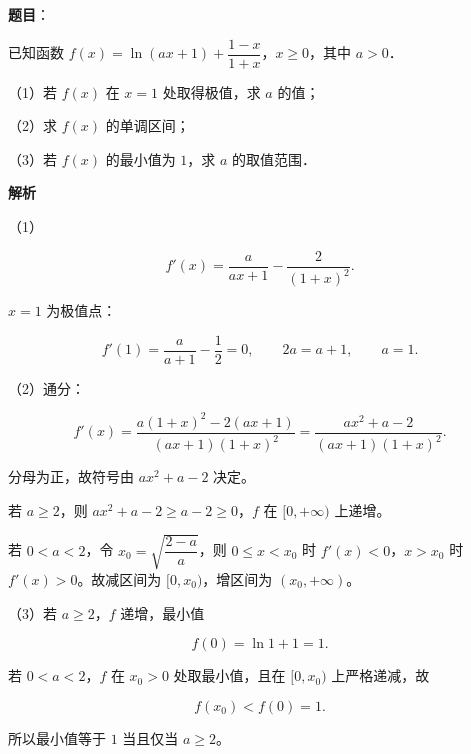 \begin{answer}

\textbf{题目}：

已知函数 $f(x)=\ln(ax+1)+\dfrac{1-x}{1+x}$，$x\geqslant0$，其中 $a>0$．

（1）若 $f(x)$ 在 $x=1$ 处取得极值，求 $a$ 的值；

（2）求 $f(x)$ 的单调区间；

（3）若 $f(x)$ 的最小值为 $1$，求 $a$ 的取值范围．

\textbf{解析}

（1）

\nopagebreak[4]
\[f'(x)=\frac a{ax+1}-\frac2{(1+x)^2}.\]

$x=1$ 为极值点：

\nopagebreak[4]
\[f'(1)=\frac a{a+1}-\frac12=0,\qquad 2a=a+1,\qquad a=1.\]

（2）通分：

\nopagebreak[4]
\[f'(x)=\frac{a(1+x)^2-2(ax+1)}{(ax+1)(1+x)^2}
=\frac{ax^2+a-2}{(ax+1)(1+x)^2}.\]

分母为正，故符号由 $ax^2+a-2$ 决定。

若 $a\geqslant2$，则 $ax^2+a-2\geqslant a-2\geqslant0$，$f$ 在 $[0,+\infty)$ 上递增。

若 $0<a<2$，令 $x_0=\sqrt{\dfrac{2-a}a}$，则 $0\leqslant x<x_0$ 时 $f'(x)<0$，$x>x_0$ 时 $f'(x)>0$。故减区间为 $[0,x_0)$，增区间为 $(x_0,+\infty)$。

（3）若 $a\geqslant2$，$f$ 递增，最小值

\nopagebreak[4]
\[f(0)=\ln1+1=1.\]

若 $0<a<2$，$f$ 在 $x_0>0$ 处取最小值，且在 $[0,x_0)$ 上严格递减，故

\nopagebreak[4]
\[f(x_0)<f(0)=1.\]

所以最小值等于 $1$ 当且仅当 $a\geqslant2$。

\gkanswer{答案：（1）$a=1$；（2）$a\geqslant2$ 时在 $[0,+\infty)$ 递增；$0<a<2$ 时减区间 $\left[0,\sqrt{\dfrac{2-a}a}\right)$，增区间 $\left(\sqrt{\dfrac{2-a}a},+\infty\right)$；（3）$a\geqslant2$。}

\end{answer}
